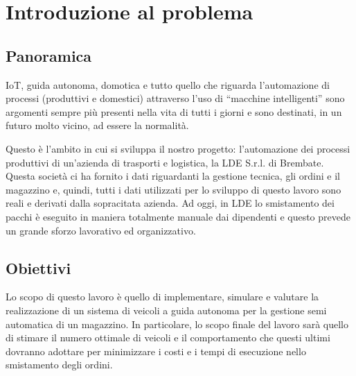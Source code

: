 \documentclass[12pt]{article}
\begin{document}
\begin{titlepage}

\vfill %
\end{titlepage}


\renewcommand{\contentsname}{Contenuti}
\renewcommand\listfigurename{Lista delle figure}
\renewcommand\listtablename{Lista delle tabelle}

\tableofcontents

\newpage

\listoffigures
\listoftables



\newpage 
\section{Introduzione al problema} %
\subsection{Panoramica}
IoT, guida autonoma, domotica e tutto quello che riguarda l’automazione di processi (produttivi e domestici) attraverso l’uso di “macchine intelligenti” sono argomenti sempre più presenti nella vita di tutti i giorni e sono destinati, in un futuro molto vicino, ad essere la normalità.

\noindent Questo è l’ambito in cui si sviluppa il nostro progetto: l’automazione dei processi produttivi di un’azienda di trasporti e logistica, la LDE S.r.l. di Brembate. Questa società ci ha fornito i dati riguardanti la gestione tecnica, gli ordini e il magazzino e, quindi, tutti i dati utilizzati per lo sviluppo di questo lavoro sono reali e derivati dalla sopracitata azienda.
Ad oggi, in LDE lo smistamento dei pacchi è eseguito in maniera totalmente manuale dai dipendenti e questo prevede un grande sforzo lavorativo ed organizzativo.

\subsection{Obiettivi}
Lo scopo di questo lavoro è quello di implementare, simulare e valutare la realizzazione di un sistema di veicoli a guida autonoma per la gestione semi automatica di un magazzino.
In particolare, lo scopo finale del lavoro sarà quello di stimare il numero ottimale di veicoli e il comportamento che questi ultimi dovranno adottare per minimizzare i costi e i tempi di esecuzione nello smistamento degli ordini.
\end{document}
